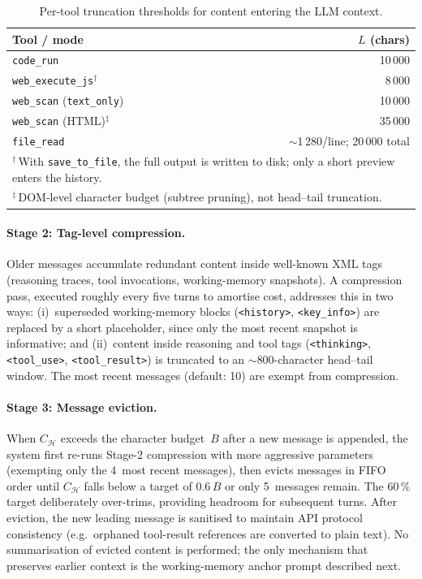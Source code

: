 \begin{table}[h]
\centering
\caption{Per-tool truncation thresholds for content entering the LLM context.}
\label{tab:tool-truncation}
\begin{tabular}{lr}
\toprule
Tool / mode & $L$ (chars) \\
\midrule
\texttt{code\_run}                          & 10\,000 \\
\texttt{web\_execute\_js}$^{\dagger}$       &  8\,000 \\
\texttt{web\_scan} (\texttt{text\_only})    & 10\,000 \\
\texttt{web\_scan} (HTML)$^{\ddagger}$      & 35\,000 \\
\texttt{file\_read}                         & ${\sim}$1\,280/line; 20\,000 total \\
\bottomrule
\multicolumn{2}{l}{\footnotesize $^{\dagger}$\,With \texttt{save\_to\_file},
  the full output is written to disk; only a short preview enters the history.} \\
\multicolumn{2}{l}{\footnotesize $^{\ddagger}$\,DOM-level character budget
  (subtree pruning), not head--tail truncation.}
\end{tabular}
\end{table}

\paragraph{Stage 2: Tag-level compression.}
Older messages accumulate redundant content inside well-known XML tags
(reasoning traces, tool invocations, working-memory snapshots).  A
compression pass, executed roughly every five turns to amortise cost,
addresses this in two ways:
(i)~superseded working-memory blocks (\texttt{<history>},
\texttt{<key\_info>}) are replaced by a short placeholder, since
only the most recent snapshot is informative; and
(ii)~content inside reasoning and tool tags (\texttt{<thinking>},
\texttt{<tool\_use>}, \texttt{<tool\_result>}) is truncated to an
$\sim$800-character head--tail window.
The most recent messages (default: 10) are exempt from compression.

\paragraph{Stage 3: Message eviction.}
When $C_{\mathcal{H}}$ exceeds the character budget~$B$
after a new message is appended, the system first re-runs Stage-2
compression with more aggressive parameters (exempting only the 4~most
recent messages), then evicts messages in FIFO order until
$C_{\mathcal{H}}$ falls below a target of $0.6\,B$ or
only 5~messages remain.  The 60\,\% target deliberately over-trims,
providing headroom for subsequent turns.  After eviction, the new leading
message is sanitised to maintain API protocol consistency (e.g.\ orphaned
tool-result references are converted to plain text).  No summarisation of
evicted content is performed; the only mechanism that preserves earlier
context is the working-memory anchor prompt described next.

